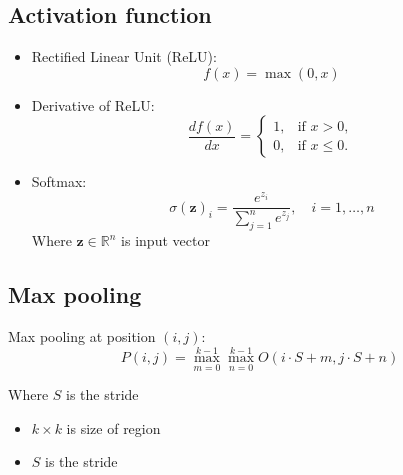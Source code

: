 \documentclass[journal]{IEEEtran} %
\begin{document}
\subsection{Activation function}
\begin{itemize}
    \item Rectified Linear Unit (ReLU):
        \begin{equation}
            f(x) = \max(0, x)
        \end{equation}
    \item Derivative of ReLU:
        \begin{equation}
        \frac{df(x)}{dx} = 
            \begin{cases} 
                1, & \text{if } x > 0, \\
                0, & \text{if } x \leq 0.
            \end{cases}
        \end{equation}
    \item Softmax:
        \begin{equation}
            \sigma(\mathbf{z})_i = \frac{e^{z_i}}{\sum_{j=1}^n e^{z_j}}, \quad i = 1, \dots, n
        \end{equation}
        Where  $\mathbf{z} \in \mathbb{R}^n$ is input vector
\end{itemize}

\subsection{Max pooling}
Max pooling at position $(i,j)$:
\begin{equation}
P(i,j) = \max_{m=0}^{k-1} \max_{n=0}^{k-1} O(i \cdot S + m, j \cdot S + n)
\end{equation}

    Where $S$ is the stride
    \begin{itemize}
        \item $k \times k$ is size of region
        \item $S$ is the stride
    \end{itemize}
    
\end{document}
